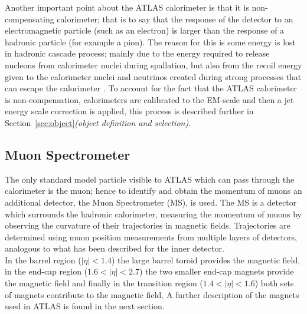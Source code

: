 Another important point about the ATLAS calorimeter is that it is non-compensating calorimeter;
that is to say that the response of the detector to an electromagnetic particle (such as an electron)
is larger than the response of a hadronic particle (for example a pion).
The reason for this is some energy is lost in hadronic cascade process;
mainly due to the energy required to release nucleons from calorimeter nuclei during spallation,
but also from the recoil energy given to the calorimeter nuclei
and neutrinos created during strong processes that can escape the calorimeter \cite{det-comp_calo, det-thesis_lene}.
To account for the fact that the ATLAS calorimeter is non-compensation,
calorimeters are calibrated to the EM-scale
and then a jet energy scale correction is applied,
this process is described further in Section~\ref{sec:object}\textit{(object definition and selection)}. \\

\subsection{Muon Spectrometer}
\label{sec:det-MS}

The only standard model particle visible to ATLAS which can pass through the calorimeter is the muon;
hence to identify and obtain the momentum of muons an additional detector, the Muon Spectrometer (MS), is used.
The MS is a detector which surrounds the hadronic calorimeter,
measuring the momentum of muons by observing the curvature of their trajectories in magnetic fields.
Trajectories are determined using muon position measurements from multiple layers of detectors,
analogous to what has been described for the inner detector. \\

In the barrel region ($|\eta| < 1.4$) the large barrel toroid provides the magnetic field,
in the end-cap region ($1.6 < |\eta| < 2.7$) the two smaller end-cap magnets  provide the magnetic field
and finally in the transition region ($1.4 < |\eta| < 1.6$) both sets of magnets contribute to the magnetic field.
A further description of the magnets used in ATLAS is found in the next section. \\

